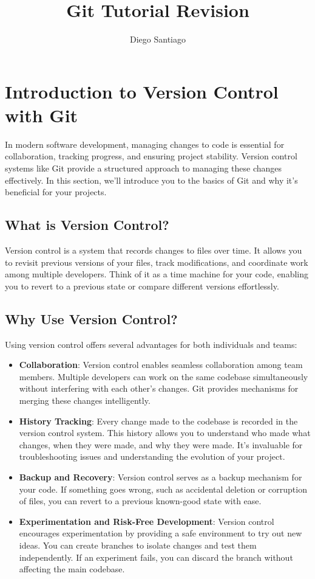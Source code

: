 \documentclass[10pt,twocolumn]{article}
\title{Git Tutorial Revision}
\author{Diego Santiago}
\affiliation{Occidental College}
\begin{document}
\maketitle


\section{Introduction to Version Control with Git}

In modern software development, managing changes to code is essential for collaboration, tracking progress, and ensuring project stability. Version control systems like Git provide a structured approach to managing these changes effectively. In this section, we'll introduce you to the basics of Git and why it's beneficial for your projects.

\subsection{What is Version Control?}

Version control is a system that records changes to files over time. It allows you to revisit previous versions of your files, track modifications, and coordinate work among multiple developers. Think of it as a time machine for your code, enabling you to revert to a previous state or compare different versions effortlessly.

\subsection{Why Use Version Control?}

Using version control offers several advantages for both individuals and teams:

\begin{itemize}
\item \textbf{Collaboration}: Version control enables seamless collaboration among team members. Multiple developers can work on the same codebase simultaneously without interfering with each other's changes. Git provides mechanisms for merging these changes intelligently.

\item \textbf{History Tracking}: Every change made to the codebase is recorded in the version control system. This history allows you to understand who made what changes, when they were made, and why they were made. It's invaluable for troubleshooting issues and understanding the evolution of your project.

\item \textbf{Backup and Recovery}: Version control serves as a backup mechanism for your code. If something goes wrong, such as accidental deletion or corruption of files, you can revert to a previous known-good state with ease.

\item \textbf{Experimentation and Risk-Free Development}: Version control encourages experimentation by providing a safe environment to try out new ideas. You can create branches to isolate changes and test them independently. If an experiment fails, you can discard the branch without affecting the main codebase.
\end{itemize}
\end{document}
